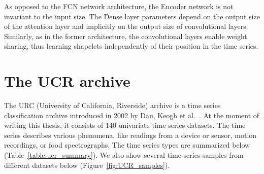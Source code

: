 \documentclass[a4paper,11pt,twoside]{report}
\theoremstyle{definition}
\begin{document}
As opposed to the FCN network architecture, the Encoder network is not invariant to the input size. The Dense layer parameters depend on the output size of the attention layer and implicitly on the output size of convolutional layers.  Similarly, as in the former architecture, the convolutional layers enable weight sharing, thus learning shapelets independently of their position in the time series.


\section{The UCR archive}
The URC (University of California, Riverside) archive is a time series classification archive introduced in 2002 by Dau, Keogh et al.~\cite{UCR_archive, UCR_article}. At the moment of writing this thesis, it consists of 140 univariate time series datasets. The time series describes various phenomena, like readings from a device or sensor, motion recordings, or food spectrographs. The time series types are summarized below (Table~\ref{table:ucr_summary}). We also show several time series samples from different datasets below (Figure~\ref{fig:UCR_samples}).
\begin{table}[!h]
\caption{Summary of types of datasets in the UCR archive.}
\centering
\tabcolsep=0.11cm
\label{table:ucr_summary}
\end{table}
\FloatBarrier
\end{document}
